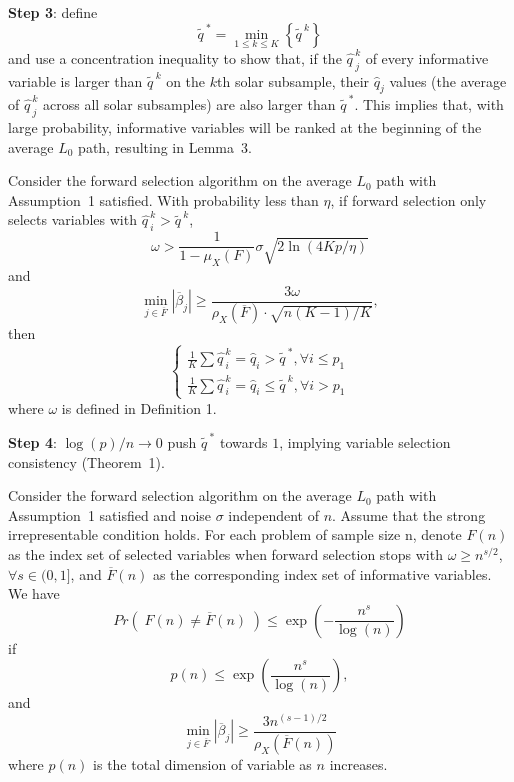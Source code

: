 \bigskip
\noindent
\textbf{Step 3}: define
  \[
    \widetilde{q\,}^{*}=\min_{1\leq k\leq K}\left\{ \widetilde{q\,}^{k}\right\}
  \]
  and use a concentration inequality to show that, if the $\widehat{q\,}^k_j$ of every informative variable is larger than $\widetilde{q\,}^{k}$ on the $k$th solar subsample, their $\widehat{q}_j$ values (the average of $\widehat{q\,}^k_j$ across all solar subsamples) are also larger than $\widetilde{q\,}^{*}$. This implies that, with large probability, informative variables will be ranked at the beginning of the average $L_0$ path, resulting in Lemma~3.


\begin{lemma}
Consider the forward selection algorithm on the average $L_{0}$ path with Assumption~1 satisfied. With probability less than $\eta$, if forward selection only selects variables with $\widehat{q\,}_{i}^{k}>\widetilde{q\,}^{k}$,
\[
    \omega>\frac{1}{1-\mu_{X}\left(F\right)}\sigma\sqrt{2\ln\left(4Kp/\eta\right)}
\]
and
\[
    \min_{j\in\overline{F}}\left|\overline{\beta}_{j}\right|\geqslant\frac{3\omega}{\rho_{X}\left(\overline{F}\right)\cdot\sqrt{n\left(K-1\right)/K}},
\]
then
\[
\begin{cases}
    \frac{1}{K}\sum\widehat{q\,}_{i}^{k}=\widehat{q}_{i}>\widetilde{q\,}^{*},\forall i\leqslant p_{1}\\
    \frac{1}{K}\sum\widehat{q\,}_{i}^{k}=\widehat{q}_{i}\leqslant\widetilde{q\,}^{k},\forall i>p_{1}
\end{cases}
\]
where $\omega$ is defined in Definition 1.
\end{lemma}

\bigskip
\noindent
\textbf{Step 4}: $\log\left(p\right)/n \rightarrow 0$ push $\widetilde{q\,}^{*}$ towards $1$, implying variable selection consistency (Theorem~1).

\begin{theorem}
Consider the forward selection algorithm on the average $L_{0}$ path with Assumption~1 satisfied and noise $\sigma$ independent of $n$. Assume that the strong irrepresentable condition holds. For each problem of sample size n, denote $F\left(n\right)$ as the index set of selected variables when forward selection stops with $\omega\geqslant n^{s/2}$, $\forall s\in(0,1]$, and $\overline{F}\left(n\right)$ as the corresponding index set of informative variables. We have
\[
    Pr\left(\;F\left(n\right)\neq\overline{F}\left(n\right)\;\right)\leqslant\exp\left(-\frac{n^{s}}{\log\left(n\right)}\right)
\]
if
\[
    p\left(n\right)\leqslant\exp\left(\frac{n^{s}}{\log\left(n\right)}\right),
\]
and
\[
    \min_{j\in\overline{F}}\left|\overline{\beta}_{j}\right|\geqslant\frac{3n^{(s-1)/2}}{\rho_{X}\left(\overline{F}\left(n\right)\right)}
\]
where $p\left(n\right)$ is the total dimension of variable as $n$ increases.
\end{theorem}
